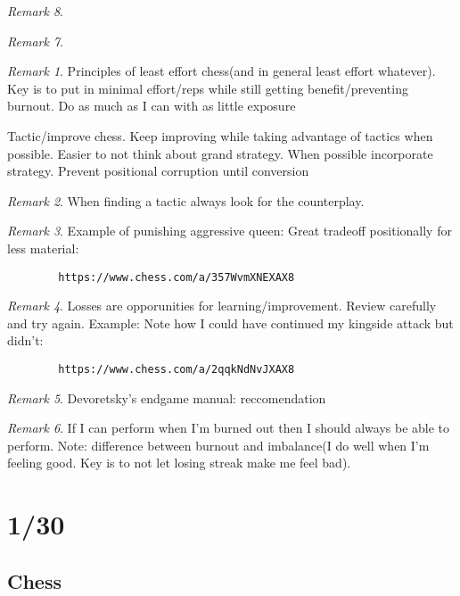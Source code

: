 \documentclass[11pt]{article}
\theoremstyle{remark}
\newtheorem{remark}{Remark}
\begin{document}
\begin{remark}
\begin{remark}
\begin{remark}
	Principles of least effort chess(and in general least effort whatever). Key is to put in minimal effort/reps while still getting benefit/preventing burnout. Do as much as I can with as little exposure

	Tactic/improve chess. Keep improving while taking advantage of tactics when possible. Easier to not think about grand strategy. When possible incorporate strategy. Prevent positional corruption until conversion

\end{remark}

\begin{remark}
	When finding a tactic always look for the counterplay.
\end{remark}

\begin{remark}
	Example of punishing aggressive queen: Great tradeoff positionally for less material: 
	\begin{verbatim}
		https://www.chess.com/a/357WvmXNEXAX8
	\end{verbatim}
\end{remark}

\begin{remark}
	Losses are opporunities for learning/improvement. Review carefully and try again. Example: Note how I could have continued my kingside attack but didn't: 
	\begin{verbatim}
		https://www.chess.com/a/2qqkNdNvJXAX8
	\end{verbatim}
\end{remark}

\begin{remark}
	Devoretsky's endgame manual: reccomendation
\end{remark}

\begin{remark}
	If I can perform when I'm burned out then I should always be able to perform. Note: difference between burnout and imbalance(I do well when I'm feeling good. Key is to not let losing streak make me feel bad).  
\end{remark}

\section{1/30}

\subsection{Chess}


\end{remark}
\end{remark}
\end{document}

